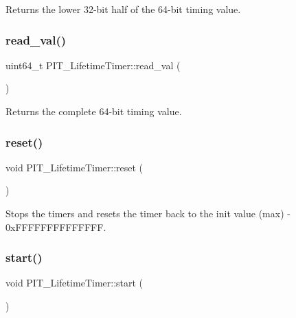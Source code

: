 Returns the lower 32-\/bit half of the 64-\/bit timing value. 

\mbox{\label{classPIT__LifetimeTimer_a4ee08cce7812322a7a10fcba0463476c}} 
\subsubsection{\texorpdfstring{read\+\_\+val()}{read\_val()}}
{\footnotesize\ttfamily uint64\+\_\+t P\+I\+T\+\_\+\+Lifetime\+Timer\+::read\+\_\+val (\begin{DoxyParamCaption}{ }\end{DoxyParamCaption})\hspace{0.3cm}{\ttfamily [inline]}}



Returns the complete 64-\/bit timing value. 

\mbox{\label{classPIT__LifetimeTimer_a5c1c38cfa6c7a049a495ee3d89e13276}} 
\subsubsection{\texorpdfstring{reset()}{reset()}}
{\footnotesize\ttfamily void P\+I\+T\+\_\+\+Lifetime\+Timer\+::reset (\begin{DoxyParamCaption}{ }\end{DoxyParamCaption})\hspace{0.3cm}{\ttfamily [inline]}}



Stops the timers and resets the timer back to the init value (max) -\/ 0x\+F\+F\+F\+F\+F\+F\+F\+F\+F\+F\+F\+F\+FF. 

\mbox{\label{classPIT__LifetimeTimer_a6feabeff2529cabaf27ef53d027a4fc9}} 
\subsubsection{\texorpdfstring{start()}{start()}}
{\footnotesize\ttfamily void P\+I\+T\+\_\+\+Lifetime\+Timer\+::start (\begin{DoxyParamCaption}{ }\end{DoxyParamCaption})\hspace{0.3cm}{\ttfamily [inline]}}



